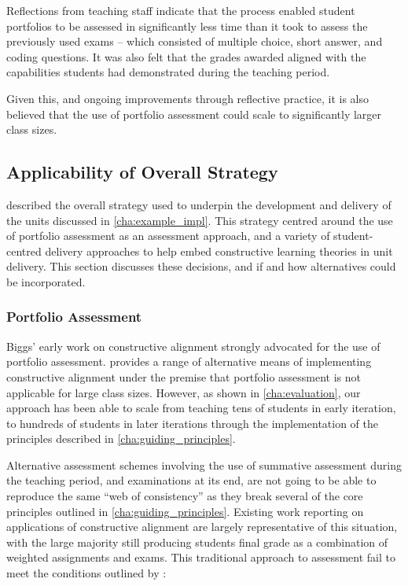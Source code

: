 Reflections from teaching staff indicate that the process enabled student portfolios to be assessed in significantly less time than it took to assess the previously used exams -- which consisted of multiple choice, short answer, and coding questions. It was also felt that the grades awarded aligned with the capabilities students had demonstrated during the teaching period.

Given this, and ongoing improvements through reflective practice, it is also believed that the use of portfolio assessment could scale to significantly larger class sizes.



\subsection{Applicability of Overall Strategy} %
\label{sub:overall_strategy}

 described the overall strategy used to underpin the development and delivery of the units discussed in \cref{cha:example_impl}. This strategy centred around the use of portfolio assessment as an assessment approach, and a variety of  student-centred delivery approaches to help embed constructive learning theories in unit delivery. This section discusses these decisions, and if and how alternatives could be incorporated.

\subsubsection{Portfolio Assessment} %
 \label{ssub:portfolio_assessment}

Biggs' early work on constructive alignment \cite{Biggs:1996c,Biggs:1999} strongly advocated for the use of portfolio assessment. \citet{Biggs:2007} provides a range of alternative means of implementing constructive alignment under the premise that portfolio assessment is not applicable for large class sizes. However, as shown in \cref{cha:evaluation}, our approach has been able to scale from teaching tens of students in early iteration, to hundreds of students in later iterations through the implementation of the principles described in \cref{cha:guiding_principles}.

Alternative assessment schemes involving the use of summative assessment during the teaching period, and examinations at its end, are not going to be able to reproduce the same ``web of consistency'' as they break several of the core principles outlined in \cref{cha:guiding_principles}. Existing work reporting on applications of constructive alignment are largely representative of this situation, with the large majority still producing students final grade as a combination of weighted assignments and exams. This traditional approach to assessment fail to meet the conditions outlined by \citet{Biggs:1996c}:

